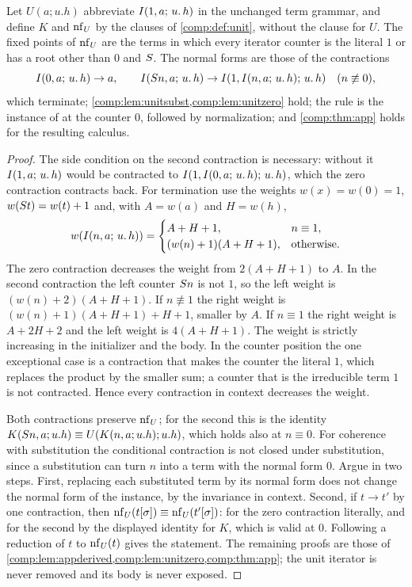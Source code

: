 \begin{proposition}
\label{comp:prop:unitabbrev}
Let $U(a;u.h)$ abbreviate $I(1,a;\,u.\,h)$ in the unchanged term grammar,
and define $K$ and $\operatorname{nf}_U$ by the clauses of \cref{comp:def:unit}, without
the clause for $U$. The fixed points of $\operatorname{nf}_U$ are the terms in which
every iterator counter is the literal $1$ or has a root other than $0$ and
$S$. The normal forms are those of the contractions
\[
 I(0,a;\,u.\,h)\to a,\qquad
 I(S n,a;\,u.\,h)\to I(1,I(n,a;\,u.\,h);\,u.\,h)\quad(n\not\equiv0),
\]
which terminate; \cref{comp:lem:unitsubst,comp:lem:unitzero} hold; the rule
 is the instance of  at the counter $0$,
followed by normalization; and \cref{comp:thm:app} holds for the resulting
calculus.
\end{proposition}

\begin{proof}
The side condition on the second contraction is necessary: without it
$I(1,a;\,u.\,h)$ would be contracted to
$I(1,I(0,a;\,u.\,h);\,u.\,h)$, which the zero contraction contracts back.
For termination use the weights $w(x)=w(0)=1$, $w(S t)=w(t)+1$ and, with
$A=w(a)$ and $H=w(h)$,
\[
 w(I(n,a;\,u.\,h))=
 \begin{cases}
  A+H+1, & n\equiv1,\\
  (w(n)+1)(A+H+1), & \text{otherwise}.
 \end{cases}
\]
The zero contraction decreases the weight from $2(A+H+1)$ to $A$. In the
second contraction the left counter $S n$ is not $1$, so the left weight
is $(w(n)+2)(A+H+1)$. If $n\not\equiv1$ the right weight is
$(w(n)+1)(A+H+1)+H+1$, smaller by $A$. If $n\equiv1$ the right weight is
$A+2H+2$ and the left weight is $4(A+H+1)$. The weight is strictly
increasing in the initializer and the body. In the counter position the one
exceptional case is a contraction that makes the counter the literal $1$,
which replaces the product by the smaller sum; a counter that is the
irreducible term $1$ is not contracted. Hence every contraction in context
decreases the weight.

Both contractions preserve $\operatorname{nf}_U$; for the second this is the identity
$K(S n,a;u.h)\equiv U(K(n,a;u.h);u.h)$, which holds also at $n\equiv0$.
For coherence with substitution the conditional contraction is not closed
under substitution, since a substitution can turn $n$ into a term with the
normal form $0$. Argue in two steps. First, replacing each substituted term
by its normal form does not change the normal form of the instance, by the
invariance in context. Second, if $t\to t'$ by one contraction, then
$\operatorname{nf}_U(t[\sigma])\equiv\operatorname{nf}_U(t'[\sigma])$: for the zero contraction
literally, and for the second by the displayed identity for $K$, which is
valid at $0$. Following a reduction of $t$ to $\operatorname{nf}_U(t)$ gives the
statement. The remaining proofs are those of
\cref{comp:lem:appderived,comp:lem:unitzero,comp:thm:app}; the unit
iterator is never removed and its body is never exposed.
\end{proof}

